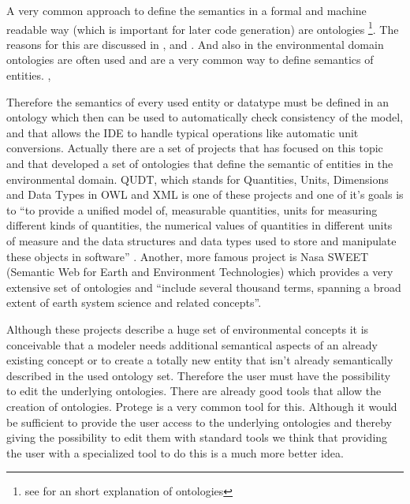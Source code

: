 A very common approach to define the semantics in a formal and machine readable way (which is important for later code generation) are ontologies \footnote{see  for an short explanation of ontologies}. The reasons for this are discussed in \autocite{toolchain:protege_onto}, \autocite{toolchain:gruber} and \autocite{toolchain:musen}. And also in the environmental domain ontologies are often used and are a very common way to define semantics of entities. \autocite{dsl:muetzelfeldt}, \autocite{Villa2009577}


Therefore the semantics of every used entity or datatype must be defined in an ontology which then can be used to automatically check consistency of the model, and that allows the IDE to handle typical operations like automatic unit conversions. Actually there are a set of projects that has focused on this topic  and that developed a set of ontologies that define the semantic of entities in the environmental domain.  QUDT, which stands for Quantities, Units, Dimensions and Data Types in OWL and XML \autocite{toolchain:qudt} is one of these projects and one of it’s goals is to ``to provide a unified model of, measurable quantities, units for measuring different kinds of quantities, the numerical values of quantities in different units of measure and the data structures and data types used to store and manipulate these objects in software'' \autocite{toolchain:qudt}. Another, more famous project is Nasa SWEET (Semantic Web for Earth and Environment Technologies) \autocite{toolchain:nasa_sweet} which provides a very extensive set of ontologies and ``include several thousand terms, spanning a broad extent of earth system science and related concepts''\autocite{nasa_sweet_guide}.


Although these projects describe a huge set of environmental concepts it is conceivable that a modeler needs additional semantical aspects of an already existing concept or to create a totally new entity that isn’t already semantically described in the used ontology set. Therefore the user must have the possibility to edit the underlying ontologies.  There are already good tools that allow the creation of ontologies. Protege \autocite{dsl:protege} is a very common tool for this. Although it would be sufficient to provide the user access to the underlying ontologies and thereby giving  the possibility to edit them with standard tools we think that providing the user with a specialized tool to do this is a much more better idea.


